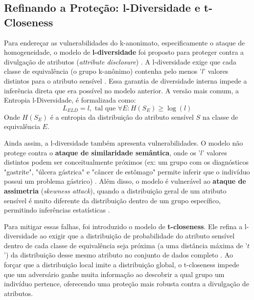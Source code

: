 \subsection{Refinando a Proteção: l-Diversidade e t-Closeness}
\label{subsec:fund-l-diversidade}

Para endereçar as vulnerabilidades do k-anonimato, especificamente o ataque de homogeneidade, o modelo de \textbf{l-diversidade} foi proposto para proteger contra a divulgação de atributos (\textit{attribute disclosure}) \cite{Sepas2022}. A l-diversidade exige que cada classe de equivalência (o grupo k-anônimo) contenha pelo menos '$l$' valores distintos para o atributo sensível \cite{Zuo2021Data, Olatunji2024}. Essa garantia de diversidade interna impede a inferência direta que era possível no modelo anterior. A versão mais comum, a Entropia l-Diversidade, é formalizada como:
$$L_{ELD} = l, \text{ tal que } \forall E : H(S_E) \geq \log(l)$$
Onde $H(S_E)$ é a entropia da distribuição do atributo sensível $S$ na classe de equivalência $E$.

Ainda assim, a l-diversidade também apresenta vulnerabilidades. O modelo não protege contra o \textbf{ataque de similaridade semântica}, onde os '$l$' valores distintos podem ser conceitualmente próximos (ex: um grupo com os diagnósticos "gastrite", "úlcera gástrica" e "câncer de estômago" permite inferir que o indivíduo possui um problema gástrico) \cite{Olatunji2024}. Além disso, o modelo é vulnerável ao \textbf{ataque de assimetria} (\textit{skewness attack}), quando a distribuição geral de um atributo sensível é muito diferente da distribuição dentro de um grupo específico, permitindo inferências estatísticas \cite{Zuo2021Data}.

Para mitigar essas falhas, foi introduzido o modelo de \textbf{t-closeness}. Ele refina a l-diversidade ao exigir que a distribuição de probabilidade do atributo sensível dentro de cada classe de equivalência seja próxima (a uma distância máxima de '$t$') da distribuição desse mesmo atributo no conjunto de dados completo \cite{Zuo2021Data, Olatunji2024}. Ao forçar que a distribuição local imite a distribuição global, o t-closeness impede que um adversário ganhe muita informação ao descobrir a qual grupo um indivíduo pertence, oferecendo uma proteção mais robusta contra a divulgação de atributos.

